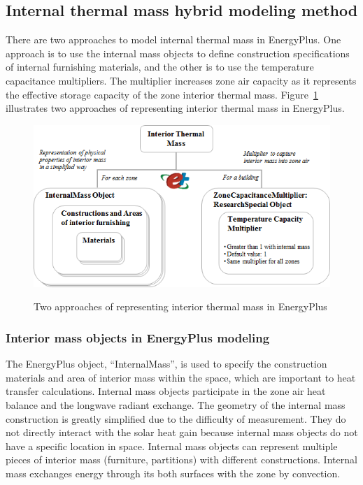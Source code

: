 \subsection{Internal thermal mass hybrid modeling method}\label{internal-thermal-mass-hybrid-modeling method}

There are two approaches to model internal thermal mass in EnergyPlus. One approach is to use the internal mass objects to define construction specifications of internal furnishing materials, and the other is to use the temperature capacitance multipliers. The multiplier increases zone air capacity as it represents the effective storage capacity of the zone interior thermal mass. Figure~\ref {fig:two-approaches-of-representing-interior-thermal-mass-in-EnergyPlus} illustrates two approaches of representing interior thermal mass in EnergyPlus.

\begin{figure}[h]
\begin{center}
\includegraphics[width=428pt]{media/img_HybridModel-2.png}
\caption{Two approaches of representing interior thermal mass in EnergyPlus}\protect \label{fig:two-approaches-of-representing-interior-thermal-mass-in-EnergyPlus}
\end{center}
\end{figure}

\subsubsection{Interior mass objects in EnergyPlus modeling}\label{interior-mass-objects-in-EnergyPlus-modeling}

The EnergyPlus object, ``InternalMass'', is used to specify the construction materials and area of interior mass within the space, which are important to heat transfer calculations. Internal mass objects participate in the zone air heat balance and the longwave radiant exchange. The geometry of the internal mass construction is greatly simplified due to the difficulty of measurement. They do not directly interact with the solar heat gain because internal mass objects do not have a specific location in space. Internal mass objects can represent multiple pieces of interior mass (furniture, partitions) with different constructions. Internal mass exchanges energy through its both surfaces with the zone by convection. 

